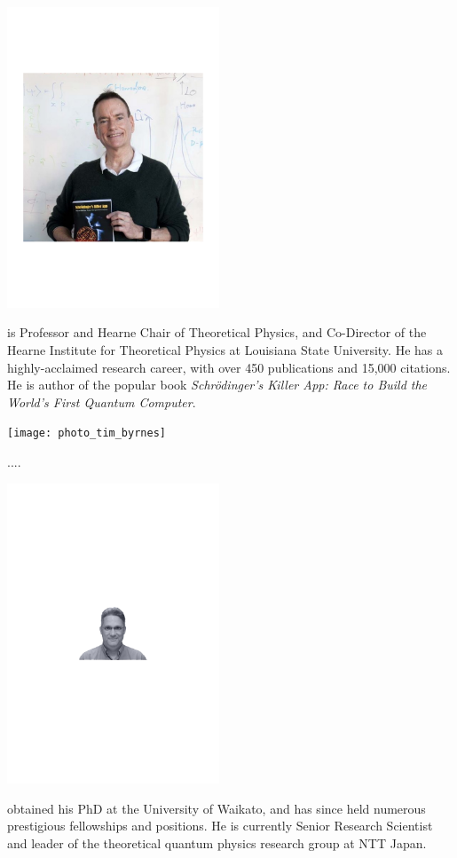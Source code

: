 \begin{center}
\includegraphics[clip=true, width=0.475\textwidth]{photo_jon_dowling}
\end{center}

 is Professor and Hearne Chair of Theoretical Physics, and Co-Director of the Hearne Institute for Theoretical Physics at Louisiana State University. He has a highly-acclaimed research career, with over 450 publications and 15,000 citations. He is author of the popular book \textit{Schr\"odinger's Killer App: Race to Build the World's First Quantum Computer}.


%
%

\begin{center}
\texttt{[image: photo\_tim\_byrnes]}
\end{center}

....


%
%

\begin{center}
\includegraphics[clip=true, width=0.475\textwidth]{photo_bill_munro}
\end{center}

 obtained his PhD at the University of Waikato, and has since held numerous prestigious fellowships and positions. He is currently Senior Research Scientist and leader of the theoretical quantum physics research group at NTT Japan.

